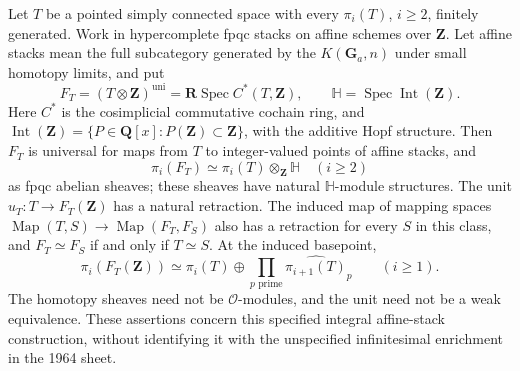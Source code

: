 \begin{theorem}\label{B:integral-affinization}
Let $T$ be a pointed simply connected space with every $\pi_i(T)$,
$i\ge2$, finitely generated. Work in hypercomplete fpqc stacks on
affine schemes over $\mathbf Z$. Let affine stacks mean the full
subcategory generated by the $K(\mathbf G_a,n)$ under small homotopy
limits, and put
\[
 F_T=(T\otimes\mathbf Z)^{\mathrm{uni}}
     =\mathbf R\operatorname{Spec}C^*(T,\mathbf Z),\qquad
 \mathbb H=\operatorname{Spec}\operatorname{Int}(\mathbf Z).
\]
Here $C^*$ is the cosimplicial commutative cochain ring, and
$\operatorname{Int}(\mathbf Z)=\{P\in\mathbf Q[x]:P(\mathbf Z)\subset\mathbf Z\}$,
with the additive Hopf structure. Then $F_T$ is universal for maps from
$T$ to integer-valued points of affine stacks, and
\[
 \pi_i(F_T)\simeq\pi_i(T)\otimes_{\mathbf Z}\mathbb H\quad(i\ge2)
\]
as fpqc abelian sheaves; these sheaves have natural $\mathbb H$-module
structures. The unit $u_T:T\to F_T(\mathbf Z)$ has a natural retraction.
The induced map of mapping spaces
$\operatorname{Map}(T,S)\to\operatorname{Map}(F_T,F_S)$ also has a
retraction for every $S$ in this class, and $F_T\simeq F_S$ if and only
if $T\simeq S$. At the induced basepoint,
\[
 \pi_i(F_T(\mathbf Z))\simeq
 \pi_i(T)\oplus\prod_{p\text{ prime}}\widehat{\pi_{i+1}(T)}_p
 \qquad(i\ge1).
\]
The homotopy sheaves need not be $\mathcal O$-modules, and the unit need
not be a weak equivalence. These assertions concern this specified
integral affine-stack construction, without identifying it with the
unspecified infinitesimal enrichment in the 1964 sheet.
\end{theorem}
